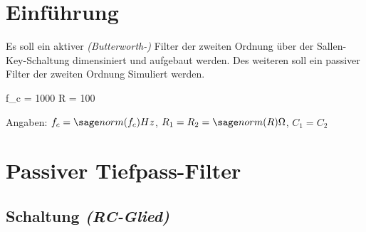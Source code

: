 \documentclass[a4paper]{hitec}
\author{Rene Hampölz, Gruppe 6}
\date{19. September 2022}
\begin{document}


\maketitletoc
\clearpage

\section{Einführung}

Es soll ein aktiver \textit{(Butterworth-)} Filter der zweiten Ordnung über der Sallen-Key-Schaltung dimensiniert und aufgebaut werden. Des weiteren soll ein passiver Filter der zweiten Ordnung Simuliert werden.

\begin{sagesilent}
    f_c = 1000
    R = 100
\end{sagesilent}

Angaben: $f_c = \var{f_c}Hz$, $R_1 = R_2 = \var{R}\Omega$, $C_1 = C_2$

\section{Passiver Tiefpass-Filter}

\subsection{Schaltung \textit{(RC-Glied)}}
\end{document}
